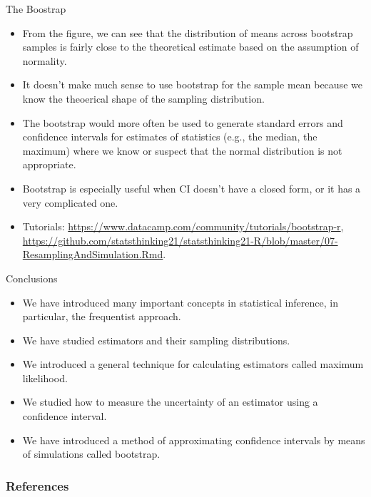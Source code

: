 \documentclass[handout]{beamer}
\begin{document}
\begin{frame}{The Boostrap}
\scriptsize{

\begin{itemize}
\item From the figure, we can see that the distribution of means across bootstrap samples is fairly close to the theoretical estimate based on the assumption of normality. 

\item It doesn't make much sense to use bootstrap for the sample mean because we know the theoerical shape of the sampling distribution.

\item The bootstrap would more often be used to generate standard errors and confidence intervals for estimates of statistics (e.g., the median, the maximum) where we know or suspect that the normal distribution is not appropriate. 

\item Bootstrap is especially useful when CI doesn't have a closed form, or it has a very complicated one.

\item Tutorials: \url{https://www.datacamp.com/community/tutorials/bootstrap-r}, \url{https://github.com/statsthinking21/statsthinking21-R/blob/master/07-ResamplingAndSimulation.Rmd}.

\end{itemize}
}
 
\end{frame}



\begin{frame}{Conclusions}
\scriptsize{

\begin{itemize}
\item We have introduced many important concepts in statistical inference, in particular, the frequentist approach.

\item We have studied estimators and their sampling distributions.

\item We introduced a general technique for calculating estimators called maximum likelihood.

\item We studied how to measure the uncertainty of an estimator using a confidence interval.

\item We have introduced a method of approximating confidence intervals by means of simulations called bootstrap.

\end{itemize}
}
 
\end{frame}


\begin{frame}[allowframebreaks]\scriptsize
\frametitle{References}


%
\end{frame}  








\end{document}
